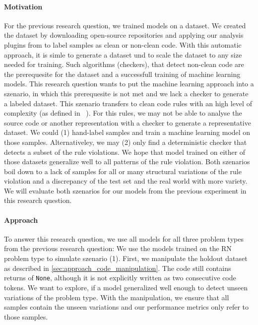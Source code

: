 \paragraph{Motivation}
For the previous research question, we trained models on a dataset. We created the dataset by downloading open-source repositories and applying our analysis plugins from  to label samples as clean or non-clean code. With this automatic approach, it is simle to generate a dataset und to scale the dataset to any size needed for training. Such algorithms (checkers), that detect non-clean code are the prerequesite for the dataset and a successfull training of machine learning models. This research question wants to put the machine learning approach into a szenario, in which this prerequesite is not met and we lack a checker to generate a labeled dataset. 
This szenario transfers to clean code rules with an high level of complexity (as defined in ~). For this rules, we may not be able to analyse the source code or another representation with a checker to generate a representative dataset. We could (1) hand-label samples and train a machine learning model on those samples. Alternativeley, we may (2) only find a deterministic checker that detects a subset of the rule violations. We hope that model trained on either of those datasets generalize well to all patterns of the rule violation. Both szenarios boil down to a lack of samples for all or many structural variations of the rule violation and a discrepancy of the test set and the real world with more variety. We will evaluate both szenarios for our models from the previous experiment in this research question.


\paragraph{Approach}
To answer this research question, we use all models for all three problem types from the previous research question: 
We use the models trained on the RN problem type to simulate szenario (1). First, we manipulate the holdout dataset as described in \ref{sec:approach_code_manipulation}. The code still contains returns of \texttt{None}, although it is not explicitly written as two consecutive code tokens. We want to explore, if a model generalized well enough to detect unseen variations of the problem type. With the manipulation, we ensure that all samples contain the unseen variations and our performance metrics only refer to those samples. 


